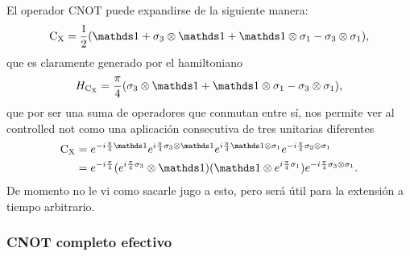 El operador \textsc{CNOT} puede expandirse de la siguiente manera:
\begin{equation*}
        \cnot=\frac{1}{2}(\Id+\pauli{3}\otimes\Id+\Id\otimes\pauli{1}-\pauli{3}\otimes\pauli{1}),
\end{equation*}
que es claramente generado por el hamiltoniano
\begin{equation*}
    H_{\cnot}=\frac{\pi}{4}\qty(\pauli{3}\otimes\Id+\Id\otimes\pauli{1}-\pauli{3}\otimes\pauli{1}),
\end{equation*}
que por ser una suma de operadores que conmutan entre sí, nos permite ver al controlled not como una aplicación consecutiva de tres unitarias diferentes
\begin{align*}
    \cnot&=e^{-i\frac{\pi}{4}\Id}e^{i\frac{\pi}{4}\pauli{3}\otimes\Id}e^{i\frac{\pi}{4}\Id\otimes\pauli{1}}e^{-i\frac{\pi}{4}\pauli{3}\otimes\pauli{1}}\\
    &=e^{-i\frac{\pi}{4}} (e^{i\frac{\pi}{4}\pauli{3}}\otimes \Id) (\Id \otimes e^{i\frac{\pi}{4}\pauli{1}}) e^{-i\frac{\pi}{4}\pauli{3}\otimes\pauli{1}}.
\end{align*}
De momento no le vi como sacarle jugo a esto, pero será útil para la extensión a tiempo arbitrario.


\subsubsection{CNOT completo efectivo}

